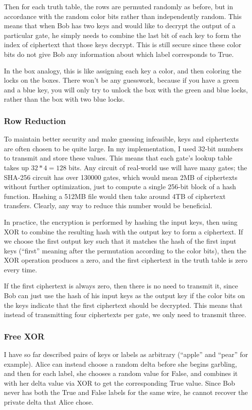 Then for each truth table, the rows are permuted randomly as before, but in accordance with the random color bits rather than independently random\cite{gentle}. This means that when Bob has two keys and would like to decrypt the output of a particular gate, he simply needs to combine the last bit of each key to form the index of ciphertext that those keys decrypt. This is still secure since these color bits do not give Bob any information about which label corresponds to True\cite{Fairplay}.

In the box analogy, this is like assigning each key a color, and then coloring the locks on the boxes. There won't be any guesswork, because if you have a green and a blue key, you will only try to unlock the box with the green and blue locks, rather than the box with two blue locks.

\subsubsection{Row Reduction}
To maintain better security and make guessing infeasible, keys and ciphertexts are often chosen to be quite large. In my implementation, I used 32-bit numbers to transmit and store these values. This means that each gate's lookup table takes up $32*4=128$ bits. Any circuit of real-world use will have many gates; the SHA-256 circuit has over 130000 gates\cite{bristol}, which would mean 2MB of ciphertexts without further optimization, just to compute a single 256-bit block of a hash function. Hashing a 512MB file would then take around 4TB of ciphertext transfers. Clearly, any way to reduce this number would be beneficial.

In practice, the encryption is performed by hashing the input keys, then using XOR to combine the resulting hash with the output key to form a ciphertext. If we choose the first output key such that it matches the hash of the first input keys (``first'' meaning after the permutation according to the color bits), then the XOR operation produces a zero, and the first ciphertext in the truth table is zero every time.

If the first ciphertext is always zero, then there is no need to transmit it, since Bob can just use the hash of his input keys as the output key if the color bits on the keys indicate that the first ciphertext should be decrypted. This means that instead of transmitting four ciphertexts per gate, we only need to transmit three.

\subsubsection{Free XOR}
I have so far described pairs of keys or labels as arbitrary (``apple'' and ``pear'' for example). Alice can instead choose a random delta before she begins garbling, and then for each label, she chooses a random value for False, and combines it with her delta value via XOR to get the corresponding True value. Since Bob never has both the True and False labels for the same wire, he cannot recover the private delta that Alice chose.

